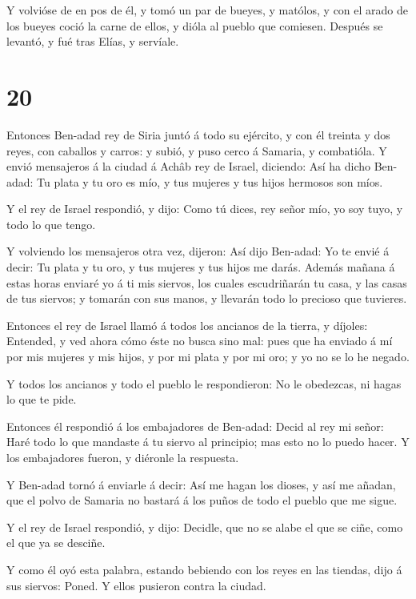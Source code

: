  Y volvióse de en pos de él, y tomó un par de bueyes, y
matólos, y con el arado de los bueyes coció la carne de ellos, y dióla
al pueblo que comiesen. Después se levantó, y fué tras Elías, y
servíale.

\hypertarget{section-19}{%
\section{20}\label{section-19}}

 Entonces Ben-adad rey de Siria juntó á todo su ejército, y
con él treinta y dos reyes, con caballos y carros: y subió, y puso cerco
á Samaria, y combatióla.  Y envió mensajeros á la ciudad á
Achâb rey de Israel, diciendo:  Así ha dicho Ben-adad: Tu
plata y tu oro es mío, y tus mujeres y tus hijos hermosos son míos.

 Y el rey de Israel respondió, y dijo: Como tú dices, rey
señor mío, yo soy tuyo, y todo lo que tengo.

 Y volviendo los mensajeros otra vez, dijeron: Así dijo
Ben-adad: Yo te envié á decir: Tu plata y tu oro, y tus mujeres y tus
hijos me darás.  Además mañana á estas horas enviaré yo á ti
mis siervos, los cuales escudriñarán tu casa, y las casas de tus
siervos; y tomarán con sus manos, y llevarán todo lo precioso que
tuvieres.

 Entonces el rey de Israel llamó á todos los ancianos de la
tierra, y díjoles: Entended, y ved ahora cómo éste no busca sino mal:
pues que ha enviado á mí por mis mujeres y mis hijos, y por mi plata y
por mi oro; y yo no se lo he negado.

 Y todos los ancianos y todo el pueblo le respondieron: No
le obedezcas, ni hagas lo que te pide.

 Entonces él respondió á los embajadores de Ben-adad: Decid
al rey mi señor: Haré todo lo que mandaste á tu siervo al principio; mas
esto no lo puedo hacer. Y los embajadores fueron, y diéronle la
respuesta.

 Y Ben-adad tornó á enviarle á decir: Así me hagan los
dioses, y así me añadan, que el polvo de Samaria no bastará á los puños
de todo el pueblo que me sigue.

 Y el rey de Israel respondió, y dijo: Decidle, que no se
alabe el que se ciñe, como el que ya se desciñe.

 Y como él oyó esta palabra, estando bebiendo con los reyes
en las tiendas, dijo á sus siervos: Poned. Y ellos pusieron contra la
ciudad.

